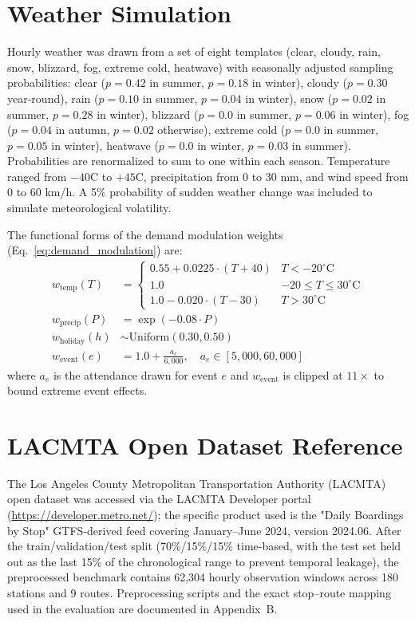 \section{Weather Simulation}

Hourly weather was drawn from a set of eight templates (clear, cloudy, rain, snow, blizzard, fog, extreme cold, heatwave) with seasonally adjusted sampling probabilities: clear ($p = 0.42$ in summer, $p = 0.18$ in winter), cloudy ($p = 0.30$ year-round), rain ($p = 0.10$ in summer, $p = 0.04$ in winter), snow ($p = 0.02$ in summer, $p = 0.28$ in winter), blizzard ($p = 0.0$ in summer, $p = 0.06$ in winter), fog ($p = 0.04$ in autumn, $p = 0.02$ otherwise), extreme cold ($p = 0.0$ in summer, $p = 0.05$ in winter), heatwave ($p = 0.0$ in winter, $p = 0.03$ in summer). Probabilities are renormalized to sum to one within each season. Temperature ranged from $-40$\textdegree C to $+45$\textdegree C, precipitation from 0 to 30 mm, and wind speed from 0 to 60 km/h. A 5\% probability of sudden weather change was included to simulate meteorological volatility.

The functional forms of the demand modulation weights (Eq.~\ref{eq:demand_modulation}) are:
\begin{align}
w_{\text{temp}}(T) &= \begin{cases} 0.55 + 0.0225 \cdot (T + 40) & T < -20^\circ\text{C} \\ 1.0 & -20 \leq T \leq 30^\circ\text{C} \\ 1.0 - 0.020 \cdot (T - 30) & T > 30^\circ\text{C} \end{cases} \\
w_{\text{precip}}(P) &= \exp(-0.08 \cdot P) \\
w_{\text{holiday}}(h) &\sim \text{Uniform}(0.30, 0.50) \\
w_{\text{event}}(e) &= 1.0 + \frac{a_e}{6{,}000}, \quad a_e \in [5{,}000, 60{,}000]
\end{align}
where $a_e$ is the attendance drawn for event $e$ and $w_{\text{event}}$ is clipped at $11\times$ to bound extreme event effects.

\section{LACMTA Open Dataset Reference}

The Los Angeles County Metropolitan Transportation Authority (LACMTA) open dataset was accessed via the LACMTA Developer portal (\url{https://developer.metro.net/}); the specific product used is the "Daily Boardings by Stop" GTFS-derived feed covering January--June 2024, version 2024.06. After the train/validation/test split (70\%/15\%/15\% time-based, with the test set held out as the last 15\% of the chronological range to prevent temporal leakage), the preprocessed benchmark contains 62{,}304 hourly observation windows across 180 stations and 9 routes. Preprocessing scripts and the exact stop--route mapping used in the evaluation are documented in Appendix~B.

